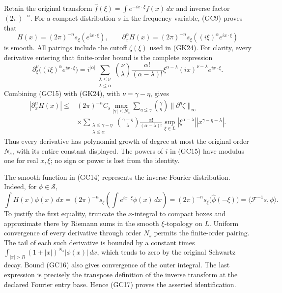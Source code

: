 \documentclass[
  11pt,
]{article}
\begin{document}
Retain the original transform
\(\widehat f(\xi)=\int e^{-ix\cdot\xi}f(x)\,dx\) and inverse factor
\((2\pi)^{-n}\). For a compact distribution \(s\) in the frequency
variable, (GC9) proves that \[
 H(x)=(2\pi)^{-n}s_\xi(e^{ix\cdot\xi}),\qquad
 \partial_x^\alpha H(x)
        =(2\pi)^{-n}s_\xi((i\xi)^\alpha e^{ix\cdot\xi})
 \tag{GC14}
\] is smooth. All pairings include the cutoff \(\zeta(\xi)\) used in
(GK24). For clarity, every derivative entering that finite-order bound
is the complete expression \[
 \partial_\xi^\nu\bigl((i\xi)^\alpha e^{ix\cdot\xi}\bigr)
 =i^{|\alpha|}
   \sum_{\substack{\lambda\leq\nu\\\lambda\leq\alpha}}
   \binom{\nu}{\lambda}\frac{\alpha!}{(\alpha-\lambda)!}
   \xi^{\alpha-\lambda}(ix)^{\nu-\lambda}e^{ix\cdot\xi}.
 \tag{GC15}
\] Combining (GC15) with (GK24), with \(\nu=\gamma-\eta\), gives \[
\begin{aligned}
 |\partial_x^\alpha H(x)|\leq{}&(2\pi)^{-n}C_s
 \max_{|\gamma|\leq N_s}
 \sum_{\eta\leq\gamma}\binom{\gamma}{\eta}
       \|\partial^\eta\zeta\|_\infty\\
 &\times\sum_{\substack{\lambda\leq\gamma-\eta\\\lambda\leq\alpha}}
   \binom{\gamma-\eta}{\lambda}\frac{\alpha!}{(\alpha-\lambda)!}
   \sup_{\xi\in L}|\xi^{\alpha-\lambda}|
   |x^{\gamma-\eta-\lambda}|.
\end{aligned}
 \tag{GC16}
\] Thus every derivative has polynomial growth of degree at most the
original order \(N_s\), with its entire constant displayed. The powers
of \(i\) in (GC15) have modulus one for real \(x,\xi\); no sign or power
is lost from the identity.

The smooth function in (GC14) represents the inverse Fourier
distribution. Indeed, for \(\phi\in\mathcal S\), \[
 \int H(x)\phi(x)\,dx
  =(2\pi)^{-n}s_\xi\left(\int e^{ix\cdot\xi}\phi(x)\,dx\right)
  =(2\pi)^{-n}s_\xi\bigl(\widehat\phi(-\xi)\bigr)
  =\langle\mathcal F^{-1}s,\phi\rangle.
 \tag{GC17}
\] To justify the first equality, truncate the \(x\)-integral to compact
boxes and approximate there by Riemann sums in the smooth
\(\xi\)-topology on \(L\). Uniform convergence of every derivative
through order \(N_s\) permits the finite-order pairing. The tail of each
such derivative is bounded by a constant times
\(\int_{|x|>R}(1+|x|)^{N_s}|\phi(x)|\,dx\), which tends to zero by the
original Schwartz decay. Bound (GC16) also gives convergence of the
outer integral. The last expression is precisely the transpose
definition of the inverse transform at the declared Fourier entry base.
Hence (GC17) proves the asserted identification.
\end{document}
